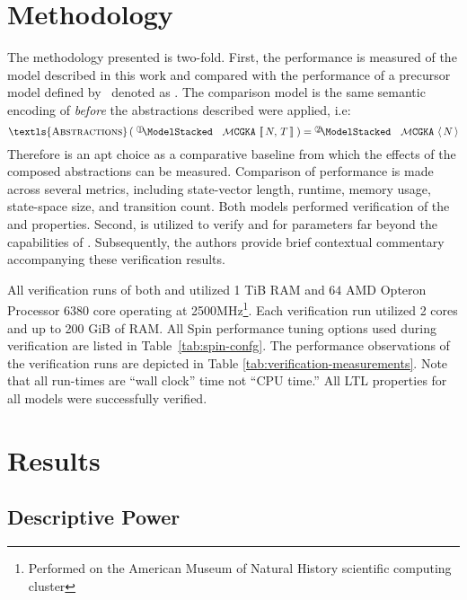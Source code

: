 \documentclass[runningheads]{llncs}
\newcommand{\Abrev}[1]{\gls{#1}}
\newcommand{\Parens}[1]{\ensuremath{\left(\;#1\;\right)}\xspace}
\begin{document}
\newcommand{\CompressedMonospace}[1]{%
{\textls{\textsc{#1}}}\xspace%
}%
\newcommand{\Code}[1]{\CompressedMonospace{#1}\xspace}

\section{Methodology}

The methodology presented is two-fold.
First, the performance is measured of the model  described in this work and compared with the performance of a precursor model defined by~\cite{washburn2022formal} 
denoted as .
The comparison model  is the same semantic encoding of  \emph{before} the abstractions described were applied, i.e:  $$\Code{Abstractions}\Parens{\CGKAmodNT{N}{T}} =  \CGKAmodN{N}$$
Therefore  is an apt choice as a comparative baseline from which the effects of the composed abstractions can be measured.
Comparison of performance is made across several metrics, including state-vector length, runtime, memory usage, state-space size, and transition count.
Both models performed verification of the  and  properties.
Second,  is utilized to verify  and  for parameters far beyond the capabilities of .
Subsequently, the authors provide brief contextual commentary accompanying these verification results.

All verification runs of both  and  utilized 1 TiB RAM and \(64\) AMD Opteron Processor 6380 core operating at 2500MHz\footnote{Performed on the American Museum of Natural History scientific computing cluster}.
Each verification run utilized 2 cores and up to 200 GiB of RAM.
All Spin performance tuning options used during verification are listed in Table~\ref{tab:spin-confg}.
The performance observations of the verification runs are depicted in Table \ref{tab:verification-measurements}.
Note that all run-times are ``wall clock'' time not ``CPU time.''
All \Abrev{LTL} properties for all models were successfully verified.


\section{Results}

\subsection{Descriptive Power\label{sec:descriptive-power}}
\end{document}
